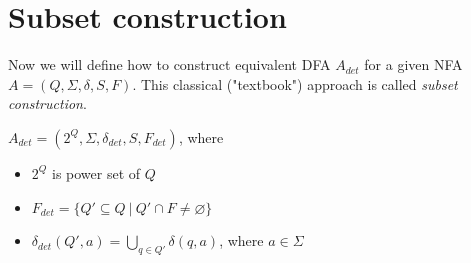 	\section{Subset construction}
	\label{subset}
	Now we will define how to construct equivalent DFA $A_{det}$ for a given NFA $A=(Q,\Sigma,\delta,S,F)$. 
	This classical ("textbook") approach is called \emph{subset construction}.
	\begin{definition}
	\label{defSubset}
		$A_{det}=(2^Q,\Sigma,\delta_{det},S,F_{det})$, where
		\begin{itemize}
			\item $2^Q$ is power set of $Q$
			\item $F_{det}=\{Q'\subseteq Q\ |\ Q'\cap F \not = \varnothing\}$
			\item $\delta_{det}(Q',a)=\bigcup\limits_{q\in Q'}\delta(q,a)$, where $a\in\Sigma$
		\end{itemize}
	\end{definition}
	
